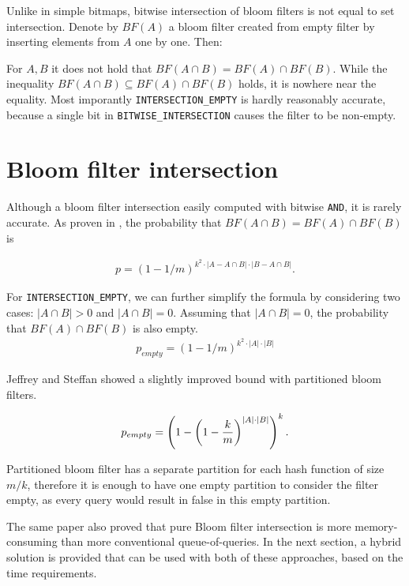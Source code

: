 Unlike in simple bitmaps, bitwise intersection of bloom filters is not equal to
set intersection.  Denote by $BF(A)$ a bloom filter created from empty
filter by inserting elements from $A$ one by one. Then:

For $A,B$ it does not hold that $BF(A \cap B) = BF(A) \cap
BF(B)$. While the inequality $BF(A \cap B) \subseteq BF(A) \cap BF(B)$ holds, it
is nowhere near the equality. Most imporantly {\tt INTERSECTION\_EMPTY} is
hardly reasonably accurate, because a single bit in {\tt BITWISE\_INTERSECTION}
causes the filter to be non-empty. 

\section{Bloom filter intersection}

Although a bloom filter intersection easily computed with bitwise {\tt AND},
it is rarely accurate. As proven in \cite{bose2008false}, the probability that
$BF(A\cap B) = BF(A) \cap BF(B)$ is

\begin{align*}
	p = (1-1/m)^{k^2\cdot |A-A\cap B| \cdot |B - A\cap B|} \mathrm{.}
\end{align*}

\noindent For {\tt INTERSECTION\_EMPTY}, we can further simplify the formula by
considering two cases: $|A \cap B| > 0$ and $|A \cap B| = 0$. Assuming that
$|A\cap B| = 0$, the probability that $BF(A) \cap BF(B)$ is also empty.
\begin{align*}
	p_{empty} = (1-1/m)^{k^2 \cdot |A| \cdot |B|}
\end{align*}

Jeffrey and Steffan \cite{Jeffrey2011} showed a slightly improved bound with
partitioned bloom filters.

\begin{align*}
	p_{empty} = \left(1 - \left( 1 - {k \over m}\right)^{|A|\cdot |B|}\right)^k \mathrm{.}
\end{align*}

Partitioned bloom filter has a separate partition for each hash function of size
$m/k$, therefore it is enough to have one empty partition to consider the filter
empty, as every query would result in false in this empty partition.

The same paper also proved that pure Bloom filter intersection is more
memory-consuming than more conventional queue-of-queries. In the next section,
a hybrid solution is provided that can be used with both of these approaches,
based on the time requirements.

